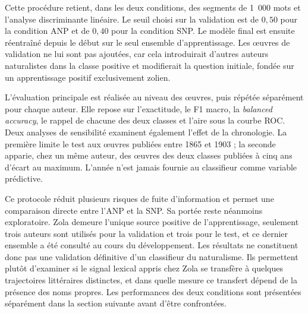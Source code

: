 Cette procédure retient, dans les deux conditions, des segments de 1~000 mots et l'analyse discriminante linéaire. Le seuil choisi sur la validation est de $0{,}50$ pour la condition ANP et de $0{,}40$ pour la condition SNP. Le modèle final est ensuite réentraîné depuis le début sur le seul ensemble d'apprentissage. Les œuvres de validation ne lui sont pas ajoutées, car cela introduirait d'autres auteurs naturalistes dans la classe positive et modifierait la question initiale, fondée sur un apprentissage positif exclusivement zolien.

L'évaluation principale est réalisée au niveau des œuvres, puis répétée séparément pour chaque auteur. Elle repose sur l'exactitude, le F1 macro, la \textit{balanced accuracy}, le rappel de chacune des deux classes et l'aire sous la courbe ROC. Deux analyses de sensibilité examinent également l'effet de la chronologie. La première limite le test aux œuvres publiées entre 1865 et 1903 ; la seconde apparie, chez un même auteur, des œuvres des deux classes publiées à cinq ans d'écart au maximum. L'année n'est jamais fournie au classifieur comme variable prédictive.

Ce protocole réduit plusieurs risques de fuite d'information et permet une comparaison directe entre l'ANP et la SNP. Sa portée reste néanmoins exploratoire. Zola demeure l'unique source positive de l'apprentissage, seulement trois auteurs sont utilisés pour la validation et trois pour le test, et ce dernier ensemble a été consulté au cours du développement. Les résultats ne constituent donc pas une validation définitive d'un classifieur du naturalisme. Ils permettent plutôt d'examiner si le signal lexical appris chez Zola se transfère à quelques trajectoires littéraires distinctes, et dans quelle mesure ce transfert dépend de la présence des noms propres. Les performances des deux conditions sont présentées séparément dans la section suivante avant d'être confrontées.
